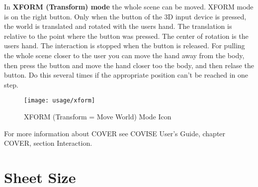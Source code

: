 \clearpage
In {\bf XFORM (Transform) mode} the whole scene 
can be moved. 
\newline
XFORM mode is on the right button.
Only when the button of the 3D input device is pressed, the world
is translated and rotated with the users hand. The translation is relative 
to the point where the button was pressed. The center of rotation is the users
hand. The interaction is stopped when the button is released. For pulling
the whole scene closer to the user you can move the hand away from the body, 
then press the button and move the hand closer too the body, and then relase 
the button. Do this several times if the appropriate position can't be 
reached in one step.\newline 
\newline
\begin{figure}[!Hhtp]
  \begin{center}
   \texttt{[image: usage/xform]}
   \caption{XFORM (Transform = Move World) Mode Icon}
  \end{center}
\end{figure}
For more information about COVER see COVISE User's Guide, chapter COVER, section Interaction.
\clearpage

\section{Sheet Size}

